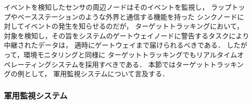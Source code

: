 イベントを検知したセンサの周辺ノードはそのイベントを監視し，
ラップトップやベースステーションのような外界と通信する機能を持った
シンクノードに対してイベントの発生を知らせるのだが，
ターゲットトラッキングにおいて，
対象を検知し，その旨をシステムのゲートウェイノードに警告するタスクにより
中継されたデータは，
適時にゲートウェイまで届けられるべきである．
したがって，環境モニタリングと同様に
ターゲットトラッキングでもリアルタイムオペレーティングシステムを採用すべきである．
本節ではターゲットトラッキングの例として，
軍用監視システムについて言及する．




\subsubsection{軍用監視システム}

